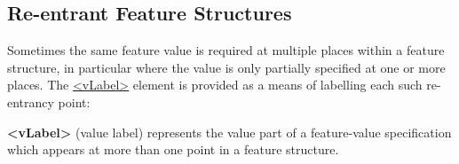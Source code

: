 \subsection[{Re-entrant Feature Structures}]{Re-entrant Feature Structures}\label{FSVAR}\par
Sometimes the same feature value is required at multiple places within a feature structure, in particular where the value is only partially specified at one or more places. The \hyperref[TEI.vLabel]{<vLabel>} element is provided as a means of labelling each such re-entrancy point: 
\begin{sansreflist}
  
\item [\textbf{<vLabel>}] (value label) represents the value part of a feature-value specification which appears at more than one point in a feature structure.
\end{sansreflist}
\par
